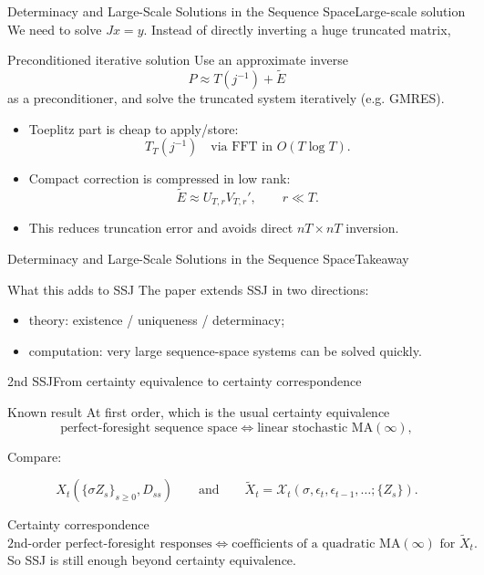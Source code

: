 \documentclass[aspectratio=169]{beamer}
\begin{document}
\begin{frame}{Determinacy and Large-Scale Solutions in the Sequence Space}{Large-scale solution}
\small
We need to solve $Jx = y$. Instead of directly inverting a huge truncated matrix,

\begin{block}{Preconditioned iterative solution}
Use an approximate inverse
\[
P \approx T(j^{-1})+\widetilde E
\]
as a preconditioner, and solve the truncated system iteratively (e.g. GMRES).
\end{block}

\begin{itemize}
    \item Toeplitz part is cheap to apply/store:
    \[
    T_T(j^{-1}) \quad \text{via FFT in } O(T\log T).
    \]
    \item Compact correction is compressed in low rank:
    \[
    \widetilde E\approx U_{T,r}V_{T,r}' ,\qquad r\ll T.
    \]
    \item This reduces truncation error and avoids direct $nT\times nT$ inversion.
\end{itemize}

\end{frame}

\begin{frame}{Determinacy and Large-Scale Solutions in the Sequence Space}{Takeaway \cite{auclert2025determinacy}}
\small
\begin{alertblock}{What this adds to SSJ}
The paper extends SSJ in two directions:
\begin{itemize}
    \item \alert{theory}: existence / uniqueness / determinacy;
    \item \alert{computation}: very large sequence-space systems can be solved quickly.
\end{itemize}
\end{alertblock}
\end{frame}

\begin{frame}{2nd SSJ}{From certainty equivalence to certainty correspondence}
\small

\begin{block}{Known result}
At first order, which is the usual certainty equivalence
\[
\text{perfect-foresight sequence space}
\Longleftrightarrow
\text{linear stochastic MA}(\infty),
\]
\end{block}

Compare:

\[
X_t\!\left(\{\sigma Z_s\}_{s\ge0},D_{ss}\right)
\qquad\text{and}\qquad
\widetilde X_t=\mathcal X_t(\sigma,\epsilon_t,\epsilon_{t-1},\ldots;\{Z_s\}).
\]

\begin{alertblock}{Certainty correspondence}
\[
\text{2nd-order perfect-foresight responses}
\Longleftrightarrow
\text{coefficients of a quadratic MA}(\infty)\text{ for }\widetilde X_t.
\]
So SSJ is still enough beyond certainty equivalence.
\end{alertblock}

\end{frame}
\end{document}
